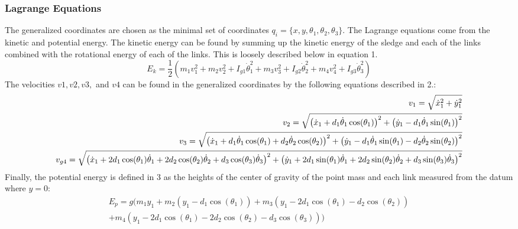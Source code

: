 \documentclass{article}
\begin{document}
\subsubsection{Lagrange Equations}
The generalized coordinates are chosen as the minimal set of coordinates $q_i = \{ x,y,\theta_1,\theta_2,\theta_3 \} $. The Lagrange equations come from the kinetic and potential energy. The kinetic energy can be found by summing up the kinetic energy of the sledge and each of the links combined with the rotational energy of each of the links. This is loosely described below in equation 1.
\begin{equation}\label{Kinetic Energy Equation}
	E_k = \frac{1}{2} \left( m_1 v_1^2 + m_2 v_2^2 + I_{g1} \dot{\theta}_1^2 + m_3 v_3^2 + I_{g2} \dot{\theta}_2^2 + m_4 v_4^2 + I_{g3} \dot{\theta}_3^2 \right) 
\end{equation}
The velocities $v1, v2, v3,$ and $v4$ can be found in the generalized coordinates by the following equations described in 2.:
\begin{equation}
	\hskip-0.0cm\begin{split}
		v_1 = \sqrt{\dot{x}_1^2 + \dot{y}_1^2} \\
		v_2 = \sqrt{\left( \dot{x}_1 + d_1 \dot{\theta}_1 \cos(\theta_1) \right)^2 + \left( \dot{y}_1 - d_1 \dot{\theta}_1 \sin(\theta_1) \right)^2}\\
		v_3 = \sqrt{\left( \dot{x}_1 + d_1 \dot{\theta}_1 \cos(\theta_1) + d_2 \dot{\theta}_2 \cos(\theta_2) \right)^2 + \left( \dot{y}_1 - d_1 \dot{\theta}_1 \sin(\theta_1) - d_2 \dot{\theta}_2 \sin(\theta_2) \right)^2}\\		
		v_{g4} = \sqrt{\left( \dot{x}_1 + 2d_1 \cos(\theta_1) \dot{\theta}_1 + 2d_2 \cos(\theta_2) \dot{\theta}_2 + d_3 \cos(\theta_3) \dot{\theta}_3 \right)^2 + \left( \dot{y}_1 + 2d_1 \sin(\theta_1) \dot{\theta}_1 + 2d_2 \sin(\theta_2) \dot{\theta}_2 + d_3 \sin(\theta_3) \dot{\theta}_3 \right)^2}		
	\end{split}
\end{equation}
Finally, the potential energy is defined in 3 as the heights of the center of gravity of the point mass and each link measured from the datum where $y=0$:
\begin{equation}
	\begin{split}
			E_p = g ( m_1 y_1 + m_2 \left( y_1 - d_1 \cos(\theta_1) \right) + m_3 \left( y_1 - 2d_1 \cos(\theta_1) - d_2 \cos(\theta_2) \right) \\
		+ m_4 \left( y_1 - 2d_1 \cos(\theta_1) - 2d_2 \cos(\theta_2) - d_3 \cos(\theta_3) \right) )	
	\end{split}
\end{equation}
\end{document}
